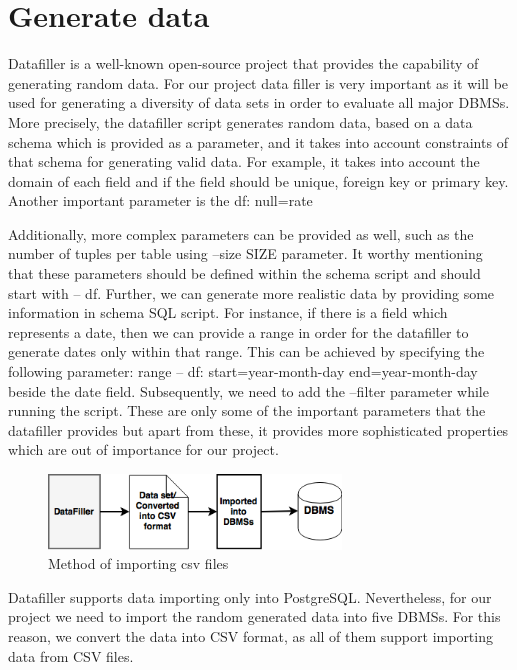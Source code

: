 \section{Generate data}
Datafiller is a well-known open-source project that provides the capability of generating random data. For our project data filler is very important as it will be used for generating a diversity of  data sets in order to evaluate all major DBMSs. More precisely, the datafiller script generates random data, based on a data schema which is provided as a parameter, and it takes into account constraints of that schema for generating valid data. For example, it takes into account the domain of each field and if the field should be unique, foreign key or primary key. Another important parameter is the df: null=rate%

Additionally, more complex parameters can be provided as well, such as the number of tuples per table using --size SIZE parameter. It worthy mentioning that these parameters should be defined within the schema script and should start with -- df.  Further, we can generate more realistic data by providing some information in schema SQL script. For instance, if there is a field which represents a date, then we can provide a range in order for the datafiller to generate dates only within that range. This can be achieved by specifying the following parameter: range -- df: start=year-month-day end=year-month-day beside the date field. Subsequently, we need to add the --filter parameter while running the script. These are only some of the important parameters that the datafiller provides but apart from these, it provides more sophisticated properties which are out of importance for our project.


 \begin{figure} 
      \centering
      \includegraphics[width=\textwidth,height=2cm]{Images/Chapter4/4-Datafiller}
      \caption{Method of importing csv files}
      \label{fig:counting-methods}
  \end{figure}  


Datafiller supports data importing only into PostgreSQL. Nevertheless, for our project we need to import the random generated data into five DBMSs. For this reason, we convert the data into CSV format, as all of them support importing data from CSV files.  


